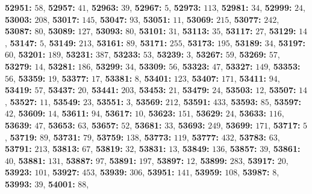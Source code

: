 \textsf{\bfseries 52951:} $58$, \textsf{\bfseries 52957:} $41$, \textsf{\bfseries 52963:} $39$, \textsf{\bfseries 52967:} $5$, \textsf{\bfseries 52973:} $113$, \textsf{\bfseries 52981:} $34$, \textsf{\bfseries 52999:} $24$, \textsf{\bfseries 53003:} $208$, \textsf{\bfseries 53017:} $145$, \textsf{\bfseries 53047:} $93$, \textsf{\bfseries 53051:} $11$, \textsf{\bfseries 53069:} $215$, \textsf{\bfseries 53077:} $242$, \textsf{\bfseries 53087:} $80$, \textsf{\bfseries 53089:} $127$, \textsf{\bfseries 53093:} $80$, \textsf{\bfseries 53101:} $31$, \textsf{\bfseries 53113:} $35$, \textsf{\bfseries 53117:} $27$, \textsf{\bfseries 53129:} $14$, \textsf{\bfseries 53147:} $5$, \textsf{\bfseries 53149:} $213$, \textsf{\bfseries 53161:} $89$, \textsf{\bfseries 53171:} $255$, \textsf{\bfseries 53173:} $195$, \textsf{\bfseries 53189:} $34$, \textsf{\bfseries 53197:} $60$, \textsf{\bfseries 53201:} $189$, \textsf{\bfseries 53231:} $387$, \textsf{\bfseries 53233:} $53$, \textsf{\bfseries 53239:} $3$, \textsf{\bfseries 53267:} $59$, \textsf{\bfseries 53269:} $57$, \textsf{\bfseries 53279:} $14$, \textsf{\bfseries 53281:} $186$, \textsf{\bfseries 53299:} $34$, \textsf{\bfseries 53309:} $56$, \textsf{\bfseries 53323:} $47$, \textsf{\bfseries 53327:} $149$, \textsf{\bfseries 53353:} $56$, \textsf{\bfseries 53359:} $19$, \textsf{\bfseries 53377:} $17$, \textsf{\bfseries 53381:} $8$, \textsf{\bfseries 53401:} $123$, \textsf{\bfseries 53407:} $171$, \textsf{\bfseries 53411:} $94$, \textsf{\bfseries 53419:} $57$, \textsf{\bfseries 53437:} $20$, \textsf{\bfseries 53441:} $203$, \textsf{\bfseries 53453:} $21$, \textsf{\bfseries 53479:} $24$, \textsf{\bfseries 53503:} $12$, \textsf{\bfseries 53507:} $14$, \textsf{\bfseries 53527:} $11$, \textsf{\bfseries 53549:} $23$, \textsf{\bfseries 53551:} $3$, \textsf{\bfseries 53569:} $212$, \textsf{\bfseries 53591:} $433$, \textsf{\bfseries 53593:} $85$, \textsf{\bfseries 53597:} $42$, \textsf{\bfseries 53609:} $14$, \textsf{\bfseries 53611:} $94$, \textsf{\bfseries 53617:} $10$, \textsf{\bfseries 53623:} $151$, \textsf{\bfseries 53629:} $24$, \textsf{\bfseries 53633:} $116$, \textsf{\bfseries 53639:} $47$, \textsf{\bfseries 53653:} $63$, \textsf{\bfseries 53657:} $52$, \textsf{\bfseries 53681:} $33$, \textsf{\bfseries 53693:} $249$, \textsf{\bfseries 53699:} $171$, \textsf{\bfseries 53717:} $5$, \textsf{\bfseries 53719:} $89$, \textsf{\bfseries 53731:} $79$, \textsf{\bfseries 53759:} $138$, \textsf{\bfseries 53773:} $119$, \textsf{\bfseries 53777:} $432$, \textsf{\bfseries 53783:} $63$, \textsf{\bfseries 53791:} $213$, \textsf{\bfseries 53813:} $67$, \textsf{\bfseries 53819:} $32$, \textsf{\bfseries 53831:} $13$, \textsf{\bfseries 53849:} $136$, \textsf{\bfseries 53857:} $39$, \textsf{\bfseries 53861:} $40$, \textsf{\bfseries 53881:} $131$, \textsf{\bfseries 53887:} $97$, \textsf{\bfseries 53891:} $197$, \textsf{\bfseries 53897:} $12$, \textsf{\bfseries 53899:} $283$, \textsf{\bfseries 53917:} $20$, \textsf{\bfseries 53923:} $101$, \textsf{\bfseries 53927:} $453$, \textsf{\bfseries 53939:} $306$, \textsf{\bfseries 53951:} $141$, \textsf{\bfseries 53959:} $108$, \textsf{\bfseries 53987:} $8$, \textsf{\bfseries 53993:} $39$, \textsf{\bfseries 54001:} $88$, 
